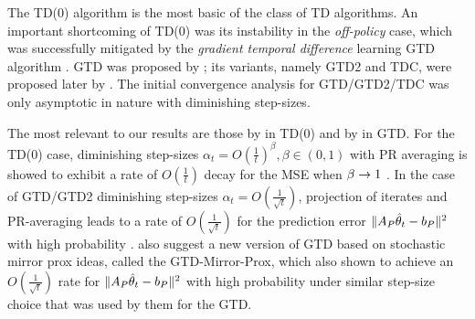 The TD(0) algorithm is the most basic of the class of TD algorithms. 
An important shortcoming of TD(0) was its instability in the \emph{off-policy} case, which 
was successfully mitigated by the \emph{gradient temporal difference} learning GTD algorithm \cite{gtd2}. 
GTD was proposed by \citet{gtd}; its variants, namely GTD2 and TDC, were proposed later by \citet{gtd2}. 
The initial convergence analysis for GTD/GTD2/TDC was only asymptotic in nature \cite{gtd,gtd2} with diminishing step-sizes.

The most relevant to our results are those by \citet{korda-prashanth} in TD(0) and by \citet{gtdmp} in GTD. For the TD(0) case,  diminishing step-sizes $\alpha_t=O(\frac{1}{t})^\beta,\beta \in(0,1)$ with PR averaging is showed to exhibit a rate of $O(\frac{1}{t})$ decay for the MSE when $\beta\rightarrow 1$ \cite{korda-prashanth}. 
In the case of GTD/GTD2 diminishing step-sizes $\alpha_t=O(\frac{1}{\sqrt{t}})$, projection of iterates and PR-averaging leads to a rate of $O(\frac{1}{\sqrt{t}})$ 
for the prediction error $\| A_P\hat{\theta}_t-b_P\|^2$ with high probability \cite{gtdmp}. 
\citet{gtdmp} also suggest a new version of GTD based on stochastic mirror prox ideas, called the GTD-Mirror-Prox, 
which also shown to achieve an $O(\frac{1}{\sqrt{t}})$ rate for $\| A_P\hat{\theta}_t-b_P\|^2$ with high probability under similar step-size choice that was used by them for the GTD.

